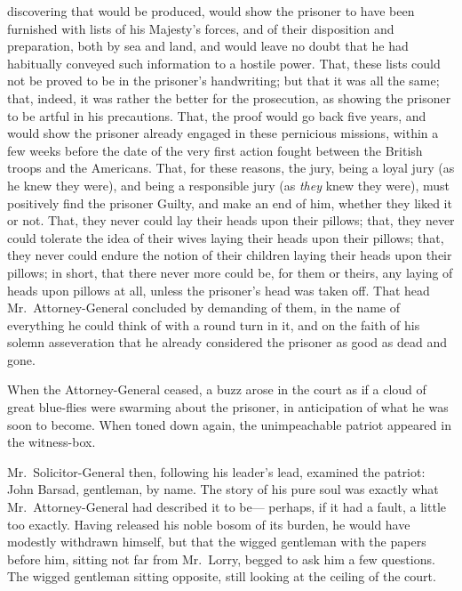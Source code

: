 discovering that would be produced, would show the prisoner to have
been furnished with lists of his Majesty's forces, and of their
disposition and preparation, both by sea and land, and would leave no
doubt that he had habitually conveyed such information to a hostile
power.  That, these lists could not be proved to be in the prisoner's
handwriting; but that it was all the same; that, indeed, it was
rather the better for the prosecution, as showing the prisoner to be
artful in his precautions.  That, the proof would go back five years,
and would show the prisoner already engaged in these pernicious
missions, within a few weeks before the date of the very first action
fought between the British troops and the Americans.  That, for these
reasons, the jury, being a loyal jury (as he knew they were), and
being a responsible jury (as \emph{they} knew they were), must positively
find the prisoner Guilty, and make an end of him, whether they liked
it or not.  That, they never could lay their heads upon their pillows;
that, they never could tolerate the idea of their wives laying their
heads upon their pillows; that, they never could endure the notion of
their children laying their heads upon their pillows; in short, that
there never more could be, for them or theirs, any laying of heads
upon pillows at all, unless the prisoner's head was taken off.  That
head Mr.\ Attorney-General concluded by demanding of them, in the name
of everything he could think of with a round turn in it, and on the
faith of his solemn asseveration that he already considered the
prisoner as good as dead and gone.

When the Attorney-General ceased, a buzz arose in the court as if
a cloud of great blue-flies were swarming about the prisoner, in
anticipation of what he was soon to become.  When toned down again,
the unimpeachable patriot appeared in the witness-box.

Mr.\ Solicitor-General then, following his leader's lead, examined
the patriot:  John Barsad, gentleman, by name.  The story of his pure
soul was exactly what Mr.\ Attorney-General had described it to be---%
perhaps, if it had a fault, a little too exactly.  Having released
his noble bosom of its burden, he would have modestly withdrawn
himself, but that the wigged gentleman with the papers before him,
sitting not far from Mr.\ Lorry, begged to ask him a few questions.
The wigged gentleman sitting opposite, still looking at the ceiling
of the court.

